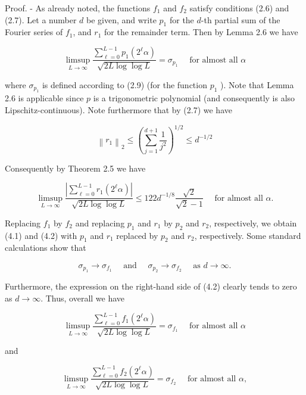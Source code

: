 \documentclass[10pt]{article}
\begin{document}
Proof. - As already noted, the functions $f_{1}$ and $f_{2}$ satisfy conditions (2.6) and (2.7). Let a number $d$ be given, and write $p_{1}$ for the $d$-th partial sum of the Fourier series of $f_{1}$, and $r_{1}$ for the remainder term. Then by Lemma 2.6 we have


\begin{equation*}
\limsup _{L \rightarrow \infty} \frac{\sum_{\ell=0}^{L-1} p_{1}\left(2^{\ell} \alpha\right)}{\sqrt{2 L \log \log L}}=\sigma_{p_{1}} \quad \text { for almost all } \alpha \tag{4.1}
\end{equation*}


where $\sigma_{p_{1}}$ is defined according to (2.9) (for the function $p_{1}$ ). Note that Lemma 2.6 is applicable since $p$ is a trigonometric polynomial (and consequently is also Lipschitz-continuous). Note furthermore that by (2.7) we have

$$
\left\|r_{1}\right\|_{2} \leqslant\left(\sum_{j=1}^{d+1} \frac{1}{j^{2}}\right)^{1 / 2} \leqslant d^{-1 / 2}
$$

Consequently by Theorem 2.5 we have


\begin{equation*}
\limsup _{L \rightarrow \infty} \frac{\left|\sum_{\ell=0}^{L-1} r_{1}\left(2^{\ell} \alpha\right)\right|}{\sqrt{2 L \log \log L}} \leqslant 122 d^{-1 / 8} \frac{\sqrt{2}}{\sqrt{2}-1} \quad \text { for almost all } \alpha . \tag{4.2}
\end{equation*}


Replacing $f_{1}$ by $f_{2}$ and replacing $p_{1}$ and $r_{1}$ by $p_{2}$ and $r_{2}$, respectively, we obtain (4.1) and (4.2) with $p_{1}$ and $r_{1}$ replaced by $p_{2}$ and $r_{2}$, respectively. Some standard calculations show that

$$
\sigma_{p_{1}} \rightarrow \sigma_{f_{1}} \quad \text { and } \quad \sigma_{p_{2}} \rightarrow \sigma_{f_{2}} \quad \text { as } d \rightarrow \infty .
$$

Furthermore, the expression on the right-hand side of (4.2) clearly tends to zero as $d \rightarrow \infty$. Thus, overall we have


\begin{equation*}
\limsup _{L \rightarrow \infty} \frac{\sum_{\ell=0}^{L-1} f_{1}\left(2^{\ell} \alpha\right)}{\sqrt{2 L \log \log L}}=\sigma_{f_{1}} \quad \text { for almost all } \alpha \tag{4.3}
\end{equation*}


and


\begin{equation*}
\limsup _{L \rightarrow \infty} \frac{\sum_{\ell=0}^{L-1} f_{2}\left(2^{\ell} \alpha\right)}{\sqrt{2 L \log \log L}}=\sigma_{f_{2}} \quad \text { for almost all } \alpha, \tag{4.4}
\end{equation*}
\end{document}
